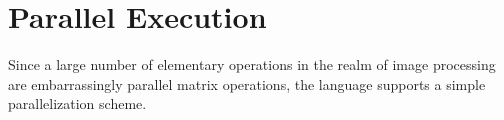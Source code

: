 \chapter{Parallel Execution}
Since a large number of elementary operations in the realm of image processing are embarrassingly parallel matrix operations, the \lepix{} language supports a simple parallelization scheme. 




